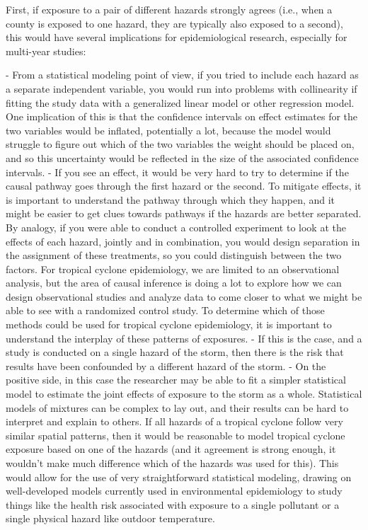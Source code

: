 First, if exposure to a pair of different hazards strongly agrees (i.e., when a
county is exposed to one hazard, they are typically also exposed to a second),
this would have several implications for epidemiological research, especially
for multi-year studies:

- From a statistical modeling point of view, if you tried to include each hazard
as a separate independent variable, you would run into problems with
collinearity if fitting the study data with a generalized linear model or other
regression model. One implication of this is that the confidence intervals on
effect estimates for the two variables would be inflated, potentially a lot,
because the model would struggle to figure out which of the two variables the
weight should be placed on, and so this uncertainty would be reflected in the
size of the associated confidence intervals.
- If you see an effect, it would be very hard to try to determine if the causal
pathway goes through the first hazard or the second. To mitigate effects, it is
important to understand the pathway through which they happen, and it might be
easier to get clues towards pathways if the hazards are better separated. By
analogy, if you were able to conduct a controlled experiment to look at the
effects of each hazard, jointly and in combination, you would design separation
in the assignment of these treatments, so you could distinguish between the two
factors. For tropical cyclone epidemiology, we are limited to an observational
analysis, but the area of causal inference is doing a lot to explore how we can
design observational studies and analyze data to come closer to what we might be
able to see with a randomized control study. To determine which of those methods
could be used for tropical cyclone epidemiology, it is important to understand
the interplay of these patterns of exposures.
- If this is the case, and a study is conducted on a single hazard of the storm, 
then there is the risk that results have been confounded by a different hazard
of the storm. 
- On the positive side, in this case the researcher may be able to fit a simpler
statistical model to estimate the joint effects of exposure to the storm as a
whole. Statistical models of mixtures can be complex to lay out, and their 
results can be hard to interpret and explain to others. If all hazards of a 
tropical cyclone follow very similar spatial patterns, then it would be 
reasonable to model tropical cyclone exposure based on one of the hazards
(and it agreement is strong enough, it wouldn't make much difference which 
of the hazards was used for this). This would allow for the use of very 
straightforward statistical modeling, drawing on well-developed models currently
used in environmental epidemiology to study things like the health risk associated
with exposure to a single pollutant or a single physical hazard like outdoor 
temperature. 

